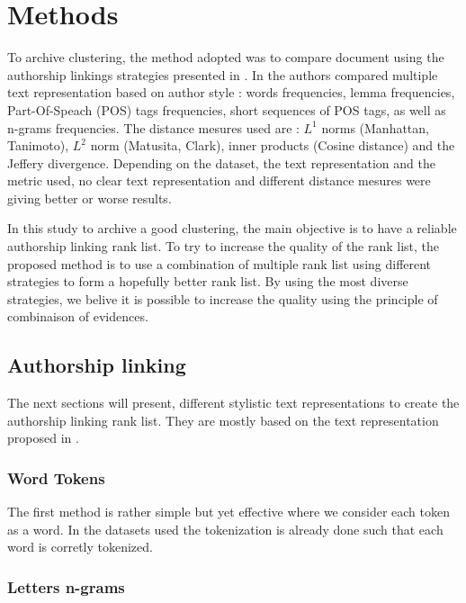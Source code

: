 \section{Methods}

To archive clustering, the method adopted was to compare document using the authorship linkings strategies presented in \cite{kocher_verification}.
In \cite{kocher_verification} the authors compared multiple text representation based on author style : words frequencies, lemma frequencies, Part-Of-Speach (POS) tags frequencies, short sequences of POS tags, as well as n-grams frequencies.
The distance mesures used are : $L^1$ norms (Manhattan, Tanimoto), $L^2$ norm (Matusita, Clark), inner products (Cosine distance) and the Jeffery divergence.
Depending on the dataset, the text representation and the metric used, no clear text representation and different distance mesures were giving better or worse results.

In this study to archive a good clustering, the main objective is to have a reliable authorship linking rank list.
To try to increase the quality of the rank list, the proposed method is to use a combination of multiple rank list using different strategies to form a hopefully better rank list.
By using the most diverse strategies, we belive it is possible to increase the quality using the principle of combinaison of evidences.

\subsection{Authorship linking}

The next sections will present, different stylistic text representations to create the authorship linking rank list. They are mostly based on the text representation proposed in \cite{kocher_verification}.

\subsubsection{Word Tokens}

The first method is rather simple but yet effective where we consider each token as a word.
In the datasets used the tokenization is already done such that each word is corretly tokenized.

\subsubsection{Letters n-grams}

